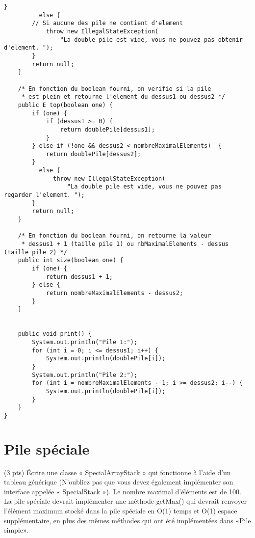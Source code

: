 \documentclass[10pt]{report}
\begin{document}
\begin{lstlisting}[style=JavaDraculaWhite]
        }
          else {
        // Si aucune des pile ne contient d'element 
            throw new IllegalStateException(
                "La double pile est vide, vous ne pouvez pas obtenir d'element. ");
        }
        return null;
    }

    /* En fonction du boolean fourni, on verifie si la pile 
     * est plein et retourne l'element du dessus1 ou dessus2 */
    public E top(boolean one) {
        if (one) {
            if (dessus1 >= 0) {
                return doublePile[dessus1];
            }
        } else if (!one && dessus2 < nombreMaximalElements)  {
            return doublePile[dessus2];
        }
          else {
              throw new IllegalStateException(
                  "La double pile est vide, vous ne pouvez pas regarder l'element. ");
        }
        return null;
    }
    
    /* En fonction du boolean fourni, on retourne la valeur   
     * dessus1 + 1 (taille pile 1) ou nbMaximalElements - dessus (taille pile 2) */
    public int size(boolean one) {
        if (one) {
            return dessus1 + 1;
        } else {
            return nombreMaximalElements - dessus2;
        }
    }


    public void print() {
        System.out.println("Pile 1:");
        for (int i = 0; i <= dessus1; i++) {
            System.out.println(doublePile[i]);
        }
        System.out.println("Pile 2:");
        for (int i = nombreMaximalElements - 1; i >= dessus2; i--) {
            System.out.println(doublePile[i]);
        }
    }
}    \end{lstlisting}

    \chapter{Pile spéciale}

    \begin{Exercice}{(3 pts)}{}
      Écrire une classe « SpecialArrayStack » qui fonctionne à l'aide 
      d'un tableau générique (N’oubliez pas que
      vous devez également implémenter son interface appelée « SpecialStack »).
      Le nombre maximal d’éléments est de 100. La pile spéciale devrait 
      implémenter une méthode getMax() qui devrait renvoyer
      l’élément maximum stocké dans la pile spéciale en O(1) temps et 
      O(1) espace supplémentaire, en plus des
      mêmes méthodes qui ont été implémentées dans «Pile simple».
    \end{Exercice}
\end{document}
